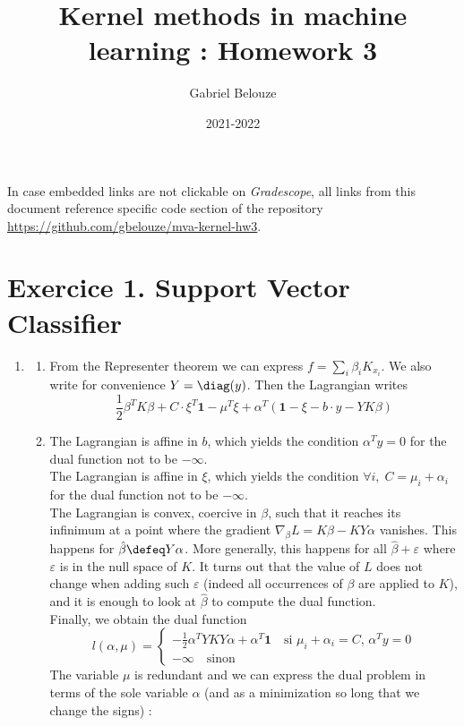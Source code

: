 \documentclass[french]{article}
\author{Gabriel Belouze}
\title{Kernel methods in machine learning : Homework 3}
\date{2021-2022}
\begin{document}
\maketitle

In case embedded links are not clickable on \textit{Gradescope}, all links from this document reference specific code section of the repository \href{https://github.com/gbelouze/mva-kernel-hw3}{https://github.com/gbelouze/mva-kernel-hw3}.

\section{Exercice 1. Support Vector Classifier}

\begin{enumerate}
\item
    \begin{enumerate}
    \item From the Representer theorem we can express $f = \sum_i \beta_i K_{x_i}$. We also write for convenience $Y = \diag(y)$. Then the Lagrangian writes
    \[ \frac{1}{2} \beta^T K \beta + C \cdot \xi^T\mathbf{1} - \mu^T \xi
    + \alpha^T (\mathbf{1} - \xi - b\cdot y - Y K \beta)
    \]
    \item
    The Lagrangian is affine in $b$, which yields the condition $\alpha^Ty = 0$ for the dual function not to be $-\infty$.\\
    The Lagrangian is affine in $\xi$, which yields the condition $\forall i, \; C = \mu_i + \alpha_i$ for the dual function not to be $-\infty$.\\
    The Lagrangian is convex, coercive in $\beta$, such that it reaches its infinimum at a point where the gradient $\nabla_\beta L = K \beta - K Y \alpha$ vanishes. This happens for $\hat{\beta} \defeq Y \alpha$. More generally, this happens for all $\hat{\beta} + \varepsilon$ where $\varepsilon$ is in the null space of $K$. It turns out that the value of $L$ does not change when adding such $\varepsilon$ (indeed all occurrences of $\beta$ are applied to $K$), and it is enough to look at $\hat{\beta}$ to compute the dual function.\\
    Finally, we obtain the dual function
    \[ l(\alpha, \mu) = \begin{cases}
    -\frac{1}{2} \alpha^T Y K Y \alpha + \alpha^T \mathbf{1} \quad \textrm{si $\mu_i+\alpha_i=C$, $\alpha^Ty=0$} \\
    -\infty \quad \textrm{sinon}
    \end{cases}
    \]
    The variable $\mu$ is redundant and we can express the dual problem in terms of the sole variable $\alpha$ (and as a minimization so long that we change the signs) :

\end{enumerate}
\end{enumerate}
\end{document}
